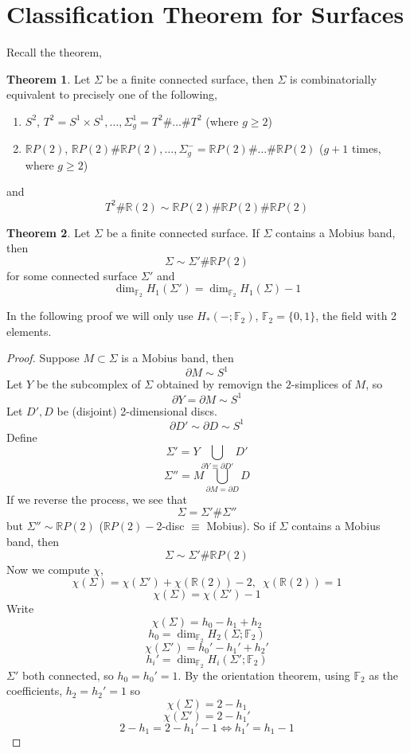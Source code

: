 \documentclass[a4paper,14pt]{extarticle}
\theoremstyle{definition}
\newtheorem*{theorem}{Theorem}
\begin{document}
\section{Classification Theorem for Surfaces}
Recall the theorem,
\begin{theorem}
	Let $\Sigma$ be a finite connected surface, then $\Sigma$ is combinatorially equivalent to
	precisely one of the following,
	\begin{enumerate}
		\item $S^2$, $T^2=S^1\times S^1,\ldots,\Sigma_g^1=T^2\#\ldots\# T^2$ (where $g\geq2$)
		\item $\mathbb{R}P(2)$, $\mathbb{R}P(2)\#\mathbb{R}P(2),\ldots,\Sigma_g^-=\mathbb{R}P(2)
		\#\ldots\#\mathbb{R}P(2)$ ($g+1$ times, where $g\geq 2$)
	\end{enumerate}
	and \[T^2\#\mathbb{R}(2)\sim\mathbb{R}P(2)\#\mathbb{R}P(2)\#\mathbb{R}P(2)\]
\end{theorem}

\begin{theorem}
	Let $\Sigma$ be a finite connected surface. If $\Sigma$ contains a Mobius band, then
	\[\Sigma\sim\Sigma'\#\mathbb{R}P(2)\] for some connected surface $\Sigma'$ and 
	\[\dim_{\mathbb{F}_2} H_1(\Sigma')=\dim_{\mathbb{F}_2} H_1(\Sigma)-1\]
\end{theorem}

In the following proof we will only use $H_*(-;\mathbb{F}_2)$, $\mathbb{F}_2=\{0,1\}$, the field with 2 elements.

\begin{proof}
	Suppose $M\subset\Sigma$ is a Mobius band, then \[\partial M\sim S^1\]
	Let $Y$ be the subcomplex of $\Sigma$ obtained by removign the $2$-simplices of $M$, so 
	\[\partial Y=\partial M\sim S^1\] Let $D',D$ be (disjoint) 2-dimensional discs.
	\[\partial D'\sim \partial D\sim S^1\] Define 
	\[\Sigma'=Y\bigcup_{\partial Y\equiv\partial D'} D'\]
	\[\Sigma''=M\bigcup_{\partial M=\partial D} D\]
	If we reverse the process, we see that
	\[\Sigma=\Sigma'\#\Sigma''\] but $\Sigma''\sim\mathbb{R}P(2)$ ($\mathbb{R}P(2)-$2-disc $
	\equiv$ Mobius). So if $\Sigma$ contains a Mobius band, then 
	\[\Sigma\sim \Sigma'\#\mathbb{R}P(2)\] Now we compute $\chi$,
	\[\chi(\Sigma)=\chi(\Sigma')+\chi(\mathbb{R}(2))-2, \,\,\,\chi(\mathbb{R}(2))=1\]
	\[\chi(\Sigma)=\chi(\Sigma')-1\] Write 
	\[\chi(\Sigma)=h_0-h_1+h_2\] \[h_0=\dim_{\mathbb{F}_2}H_2(\Sigma;\mathbb{F}_2)\]
	\[\chi(\Sigma')=h_0'-h_1'+h_2'\] \[h_i'=\dim_{\mathbb{F}_2}H_i(\Sigma';\mathbb{F}_2)\]
	$\Sigma'$ both connected, so $h_0=h_0'=1$. By the orientation theorem, using 
	$\mathbb{F}_2$ as the coefficients, $h_2=h_2'=1$ so \[\chi(\Sigma)=2-h_1\]
	\[\chi(\Sigma')=2-h_1'\]
	\[2-h_1=2-h_1'-1\iff h_1'=h_1-1\]
\end{proof}
\end{document}
